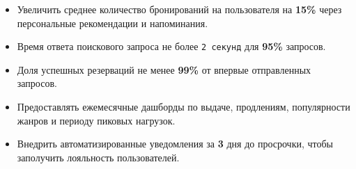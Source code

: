 \documentclass[12pt]{report}
\begin{document}
	\begin{itemize}
		\item Увеличить среднее количество бронирований на пользователя на \textbf{15\%} через персональные рекомендации и напоминания.
		
		\item Время ответа поискового запроса не более \texttt{2 секунд} для \textbf{95\%} запросов.
		
		\item Доля успешных резерваций не менее \textbf{99\%} от впервые отправленных запросов.
		
		\item Предоставлять ежемесячные дашборды по выдаче, продлениям, популярности жанров и периоду пиковых нагрузок.
		
		\item Внедрить автоматизированные уведомления за \textbf{3} дня до просрочки, чтобы заполучить лояльность пользователей.
	\end{itemize}
	
\end{document}
